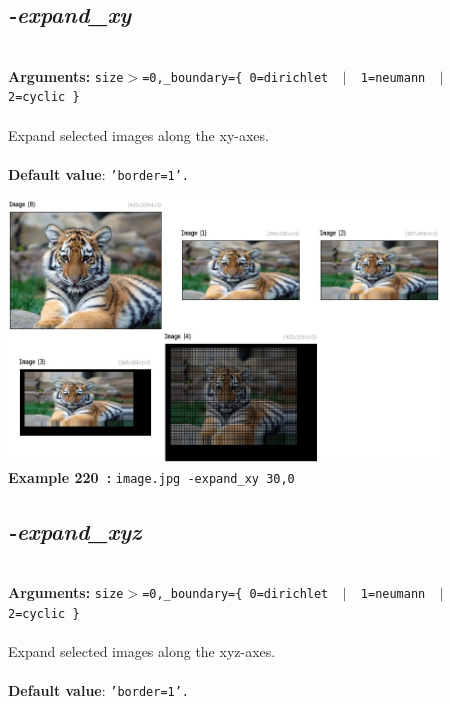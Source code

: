 \documentclass[a4paper,11pt,twoside]{book}
\begin{document}
\subsection{\emph{-expand\_xy} }\vspace*{-0.5em}
~\\\textbf{Arguments: } 
{\small \texttt{size$>$=0,\_boundary=\{ 0=dirichlet ~$|$~ 1=neumann ~$|$~ 2=cyclic \}}}\\~\\
Expand selected images along the xy-axes.
~\\~\\\textbf{Default value}: {\small \texttt{'border=1'.}}
\begin{center}\includegraphics[keepaspectratio=true,height=7cm,width=\textwidth]{img/gmic_def220.jpg}\\
{\footnotesize \textbf{Example 220~:} \texttt{image.jpg -expand\_xy 30,0}}
\end{center}

\subsection{\emph{-expand\_xyz} }\vspace*{-0.5em}
~\\\textbf{Arguments: } 
{\small \texttt{size$>$=0,\_boundary=\{ 0=dirichlet ~$|$~ 1=neumann ~$|$~ 2=cyclic \}}}\\~\\
Expand selected images along the xyz-axes.
~\\~\\\textbf{Default value}: {\small \texttt{'border=1'.}}
\end{document}
